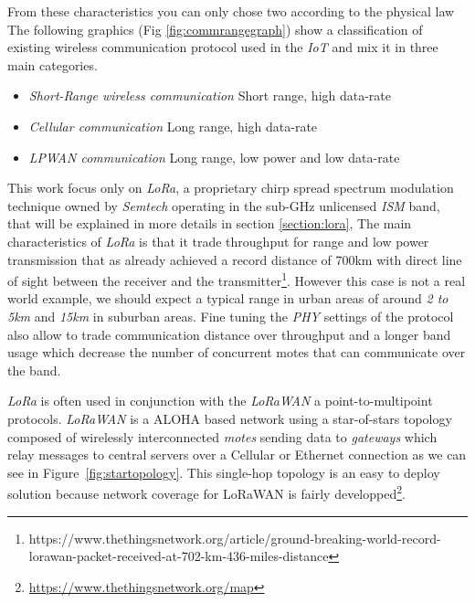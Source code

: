 From these characteristics you can only chose two according to the physical
law
The following graphics (Fig \ref{fig:commrangegraph}) show a classification of
existing wireless communication protocol used in the \emph{IoT} and mix it in three 
main categories.

\begin{itemize}
    \item \emph{Short-Range wireless communication} Short range, high data-rate
    \item \emph{Cellular communication} Long range, high data-rate
    \item \emph{LPWAN communication} Long range, low power and low data-rate
\end{itemize}



This work focus only on \emph{LoRa}, a proprietary chirp spread spectrum
modulation technique owned by \emph{Semtech} operating in the sub-GHz
unlicensed \emph{ISM} band, that will be explained in more details in section
\ref{section:lora},
The main characteristics of \emph{LoRa} is that it trade throughput for range
and low power transmission that as already achieved a record distance of 700km
with direct line of sight between the receiver and the
transmitter\footnote{https://www.thethingsnetwork.org/article/ground-breaking-world-record-lorawan-packet-received-at-702-km-436-miles-distance}.
However this case is not a real world example, we should expect a typical range
in urban areas of around \emph{2 to 5km} and \emph{15km} in suburban
areas\cite{8030482}. Fine tuning the \emph{PHY} settings of the protocol also
allow to trade communication distance over throughput and a longer band usage
which decrease the number of concurrent motes that can communicate over the
band\cite{10.1145/2988287.2989163}.

\emph{LoRa} is often used in conjunction with the \emph{LoRaWAN} a
point-to-multipoint protocols.
\emph{LoRaWAN} is a ALOHA based\cite{loraalliance:lorawanspecification} network
using a star-of-stars topology composed of wirelessly interconnected 
\emph{motes} sending data to \emph{gateways} which relay messages to central 
servers over a Cellular or Ethernet connection as we can see in 
Figure~\ref{fig:startopology}.
This single-hop topology is an easy to deploy solution because network coverage
for LoRaWAN is fairly
developped\footnote{\url{https://www.thethingsnetwork.org/map}}.

